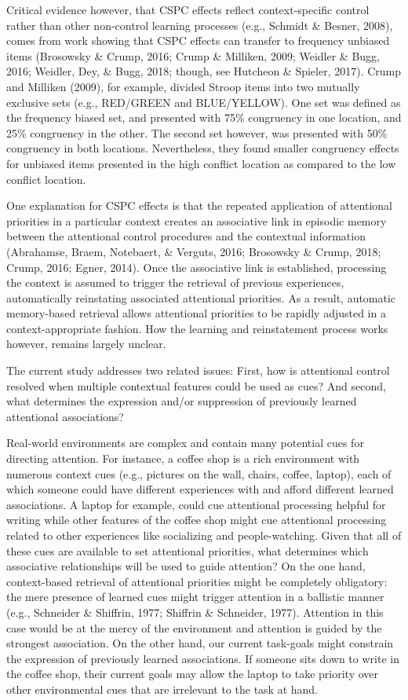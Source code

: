 \documentclass[english,,man,floatsintext]{apa6}
\begin{document}
Critical evidence however, that CSPC effects reflect context-specific control rather than other non-control learning processes (e.g., Schmidt \& Besner, 2008), comes from work showing that CSPC effects can transfer to frequency unbiased items (Brosowsky \& Crump, 2016; Crump \& Milliken, 2009; Weidler \& Bugg, 2016; Weidler, Dey, \& Bugg, 2018; though, see Hutcheon \& Spieler, 2017). Crump and Milliken (2009), for example, divided Stroop items into two mutually exclusive sets (e.g., RED/GREEN and BLUE/YELLOW). One set was defined as the frequency biased set, and presented with 75\% congruency in one location, and 25\% congruency in the other. The second set however, was presented with 50\% congruency in both locations. Nevertheless, they found smaller congruency effects for unbiased items presented in the high conflict location as compared to the low conflict location.

One explanation for CSPC effects is that the repeated application of attentional priorities in a particular context creates an associative link in episodic memory between the attentional control procedures and the contextual information (Abrahamse, Braem, Notebaert, \& Verguts, 2016; Brosowsky \& Crump, 2018; Crump, 2016; Egner, 2014). Once the associative link is established, processing the context is assumed to trigger the retrieval of previous experiences, automatically reinstating associated attentional priorities. As a result, automatic memory-based retrieval allows attentional priorities to be rapidly adjusted in a context-appropriate fashion. How the learning and reinstatement process works however, remains largely unclear.

The current study addresses two related issues: First, how is attentional control resolved when multiple contextual features could be used as cues? And second, what determines the expression and/or suppression of previously learned attentional associations?

Real-world environments are complex and contain many potential cues for directing attention. For instance, a coffee shop is a rich environment with numerous context cues (e.g., pictures on the wall, chairs, coffee, laptop), each of which someone could have different experiences with and afford different learned associations. A laptop for example, could cue attentional processing helpful for writing while other features of the coffee shop might cue attentional processing related to other experiences like socializing and people-watching. Given that all of these cues are available to set attentional priorities, what determines which associative relationships will be used to guide attention? On the one hand, context-based retrieval of attentional priorities might be completely obligatory: the mere presence of learned cues might trigger attention in a ballistic manner (e.g., Schneider \& Shiffrin, 1977; Shiffrin \& Schneider, 1977). Attention in this case would be at the mercy of the environment and attention is guided by the strongest association. On the other hand, our current task-goals might constrain the expression of previously learned associations. If someone sits down to write in the coffee shop, their current goals may allow the laptop to take priority over other environmental cues that are irrelevant to the task at hand.
\end{document}
